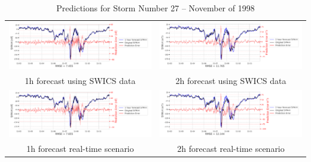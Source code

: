\documentclass[draft,sw]{agutexSI2019}
\begin{document}
\begin{table}
\centering
\begin{tabular}{cc}
\includegraphics[width=0.49\linewidth]{paper_plots_shade/1h_swics/1h_swics_storm_27.png}
&
\includegraphics[width=0.49\linewidth]{paper_plots_shade/2h_swics/2h_swics_storm_27.png}
\\
1h forecast using SWICS data & 2h forecast using SWICS data
\vspace*{12pt}
\\
\includegraphics[width=0.49\linewidth]{paper_plots_shade/1h_rt/1h_rt_storm_27.png}
&
\includegraphics[width=0.49\linewidth]{paper_plots_shade/2h_rt/2h_rt_storm_27.png}
\\
1h forecast real-time scenario & 2h forecast real-time scenario 
\vspace*{12pt}
\\
\end{tabular}
\caption{Predictions for Storm Number 27 -- November of 1998}
\label{storm-27}
\end{table}
\end{document}
